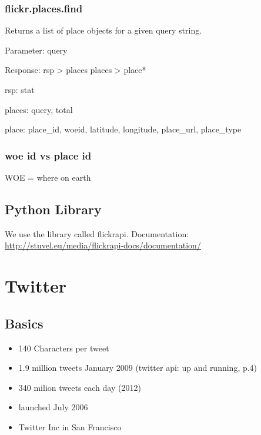 \documentclass[letterpaper,10pt,english]{sphinxmanual}
\begin{document}
\subsection{flickr.places.find}
\label{main/flickr:flickr-places-find}
Returns a list of place objects for a given query string.

Parameter: query

Response:
\textbar{} rsp \textgreater{} places
\textbar{} places \textgreater{} place*

\begin{DUlineblock}{0em}
\item[] rsp: stat
\item[] places: query, total
\item[] place: place\_id, woeid, latitude, longitude, place\_url, place\_type
\end{DUlineblock}


\subsection{woe id vs place id}
\label{main/flickr:woe-id-vs-place-id}
WOE = where on earth


\section{Python Library}
\label{main/flickr:python-library}
We use the library called flickrapi. Documentation: \href{http://stuvel.eu/media/flickrapi-docs/documentation/}{http://stuvel.eu/media/flickrapi-docs/documentation/}


\chapter{Twitter}
\label{main/twitter::doc}\label{main/twitter:twitter}

\section{Basics}
\label{main/twitter:basics}\begin{itemize}
\item {} 
140 Characters per tweet

\item {} 
1.9 million tweets January 2009 (twitter api: up and running, p.4)

\item {} 
340 milion tweets each day (2012)

\item {} 
launched July 2006

\item {} 
Twitter Inc in San Francisco

\end{itemize}
\end{document}
